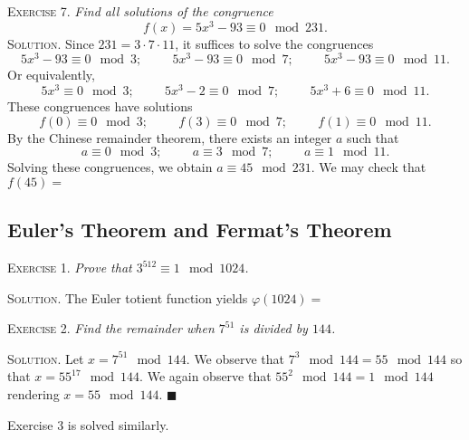 \documentclass[11pt, leqno]{article}
\newcommand{\done}{\ensuremath{\blacksquare}}
\begin{document}
\textsc{Exercise 7}. \emph{Find all solutions of the congruence 
\begin{displaymath}
f(x) = 5x^3-93 \equiv 0 \mod 231.
\end{displaymath}}\textsc{Solution}. Since $231 = 3\cdot 7\cdot 11$, it suffices to solve the congruences 
\begin{displaymath}
5x^3-93 \equiv 0 \mod 3; \hspace{1cm} 5x^3-93 \equiv 0 \mod 7; \hspace{1cm} 5x^3-93 \equiv 0 \mod 11.
\end{displaymath}Or equivalently,
\begin{displaymath}
5x^3\equiv 0 \mod 3; \hspace{1cm} 5x^3-2\equiv 0 \mod 7; \hspace{1cm} 5x^3+6 \equiv 0 \mod 11.
\end{displaymath}
These congruences have solutions 
\begin{displaymath}
f(0) \equiv 0 \mod 3; \hspace{1cm} f(3) \equiv 0 \mod 7; \hspace{1cm} f(1) \equiv 0 \mod 11.
\end{displaymath}
By the Chinese remainder theorem, there exists an integer $a$ such that 
\begin{displaymath}
a \equiv 0 \mod 3; \hspace{1cm} a \equiv 3 \mod 7; \hspace{1cm} a \equiv 1 \mod 11.
\end{displaymath}
Solving these congruences, we obtain $a \equiv 45 \mod 231$. We may check that $f(45) = $ 

\subsection{Euler's Theorem and Fermat's Theorem}

\textsc{Exercise 1}. \emph{Prove that $3^{512}\equiv 1 \mod 1024$.}

\textsc{Solution}. The Euler totient function yields $\varphi(1024) = $

\textsc{Exercise 2}. \emph{Find the remainder when $7^{51}$ is divided by $144$.}

\textsc{Solution}. Let $x=7^{51} \mod 144$. We observe that $7^3\mod 144 = 55 \mod 144$ so that $x = 55^{17} \mod 144$. We again observe that $55^2 \mod 144 = 1\mod 144$ rendering $x = 55 \mod 144$. \done

Exercise 3 is solved similarly.
\end{document}
